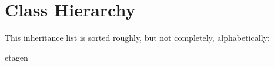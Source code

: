 \section{Class Hierarchy}
This inheritance list is sorted roughly, but not completely, alphabetically\+:\begin{DoxyCompactList}
\item etagen\begin{DoxyCompactList}
\item {}
\end{DoxyCompactList}
\end{DoxyCompactList}
